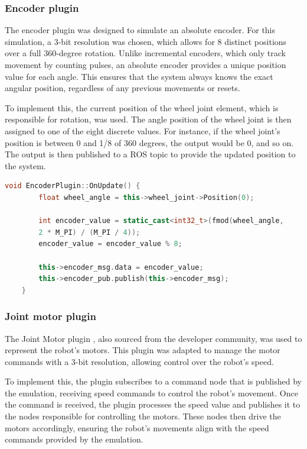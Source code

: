 \documentclass[../../monografia.tex]{subfiles}
\begin{document}
\subsubsection{Encoder plugin}
The encoder plugin was designed to simulate an absolute encoder. For this simulation, a 3-bit resolution was chosen, which allows for 8 distinct positions over a full 360-degree rotation. Unlike incremental encoders, which only track movement by counting pulses, an absolute encoder provides a unique position value for each angle. This ensures that the system always knows the exact angular position, regardless of any previous movements or resets.

To implement this, the current position of the wheel joint element, which is responsible for rotation, was used. The angle position of the wheel joint is then assigned to one of the eight discrete values. For instance, if the wheel joint’s position is between 0 and 1/8 of 360 degrees, the output would be 0, and so on. The output is then published to a ROS topic to provide the updated position to the system.

\begin{lstlisting}[language=C++, caption={Encoder plugin position update function}]
void EncoderPlugin::OnUpdate() {
        float wheel_angle = this->wheel_joint->Position(0);

        int encoder_value = static_cast<int32_t>(fmod(wheel_angle,
        2 * M_PI) / (M_PI / 4));
        encoder_value = encoder_value % 8;

        this->encoder_msg.data = encoder_value;
        this->encoder_pub.publish(this->encoder_msg);
    }
\end{lstlisting}

\subsubsection{Joint motor plugin}

The Joint Motor plugin \cite{Gazebo_ROS_Motors_23}, also sourced from the developer community, was used to represent the robot’s motors. This plugin was adapted to manage the motor commands with a 3-bit resolution, allowing control over the robot’s speed.

To implement this, the plugin subscribes to a command node that is published by the emulation, receiving speed commands to control the robot's movement. Once the command is received, the plugin processes the speed value and publishes it to the nodes responsible for controlling the motors. These nodes then drive the motors accordingly, ensuring the robot's movements align with the speed commands provided by the emulation.
\end{document}
